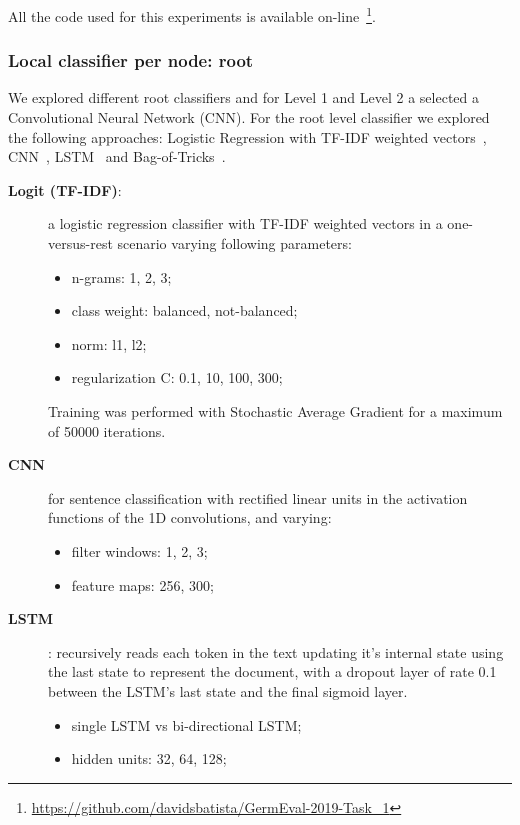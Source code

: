 \documentclass[11pt,a4paper]{article}
\begin{document}
All the code used for this experiments is available
on-line~\footnote{\url{https://github.com/davidsbatista/GermEval-2019-Task_1}}.


\subsubsection{Local classifier per node: root}

We explored different root classifiers and for Level 1 and Level 2 a
selected a Convolutional Neural Network (CNN). For the root level classifier we
explored the following approaches: Logistic Regression with TF-IDF weighted
vectors~\cite{}, CNN~\cite{kim-2014-convolutional},
LSTM~\cite{Hochreiter:1997:LSM:1246443.1246450} and
Bag-of-Tricks~\cite{joulin-etal-2017-bag}.


\begin{description}

\item[\textbf{Logit (TF-IDF)}:] a logistic regression classifier with TF-IDF
weighted vectors in a one-versus-rest scenario varying following parameters:

\begin{itemize}
\item n-grams: 1, 2, 3;
\item class weight: balanced, not-balanced;
\item norm: l1, l2;
\item regularization C: 0.1, 10, 100, 300;
\end{itemize}

Training was performed with Stochastic Average Gradient for a maximum of 50000 iterations.

\item[\textbf{CNN}] for sentence classification with rectified linear units in
the activation functions of the 1D convolutions, and varying:

\begin{itemize}
\item filter windows: 1, 2, 3;
\item feature maps: 256, 300;
\end{itemize}

\item[\textbf{LSTM}]: recursively reads each token in the text updating it's
internal state using the last state to represent the document, with a dropout
layer of rate 0.1 between the LSTM's last state and the final sigmoid layer.

\begin{itemize}
\item single LSTM vs bi-directional LSTM;
\item hidden units: 32, 64, 128;
\end{itemize}


\end{description}
\end{document}
